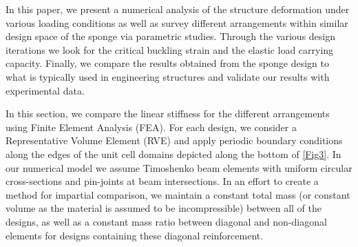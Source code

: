 \documentclass[9pt,twocolumn,twoside]{fernandes_paper}
\begin{document}
In this paper, we present a numerical analysis of the structure deformation under various loading conditions as well as survey different arrangements within similar design space of the sponge via parametric studies. Through the various design iterations we look for the critical buckling strain and the elastic load carrying capacity. Finally, we compare the results obtained from the sponge design to what is typically used in engineering structures and validate our results with experimental data.


In this section, we compare the linear stiffness for the different arrangements using Finite Element Analysis (FEA). For each design, we consider a Representative Volume Element (RVE) and apply periodic boundary conditions along the edges of the unit cell domains depicted along the bottom of \cref{Fig3}. In our numerical model we assume Timoshenko beam elements with uniform circular cross-sections and pin-joints at beam intersections. In an effort to create a method for impartial comparison, we maintain a constant total mass (or constant volume as the material is assumed to be incompressible) between all of the designs, as well as a constant mass ratio between diagonal and non-diagonal elements for designs containing these diagonal reinforcement. 
\end{document}
